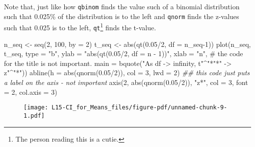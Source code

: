 \documentclass[
  letterpaper,
  DIV=11,
  numbers=noendperiod]{scrreprt}
\newenvironment{Shaded}{\begin{snugshade}}{\end{snugshade}}
\newcommand{\AttributeTok}[1]{\textcolor[rgb]{0.40,0.45,0.13}{#1}}
\newcommand{\CommentTok}[1]{\textcolor[rgb]{0.37,0.37,0.37}{#1}}
\newcommand{\DecValTok}[1]{\textcolor[rgb]{0.68,0.00,0.00}{#1}}
\newcommand{\DocumentationTok}[1]{\textcolor[rgb]{0.37,0.37,0.37}{\textit{#1}}}
\newcommand{\FloatTok}[1]{\textcolor[rgb]{0.68,0.00,0.00}{#1}}
\newcommand{\FunctionTok}[1]{\textcolor[rgb]{0.28,0.35,0.67}{#1}}
\newcommand{\NormalTok}[1]{\textcolor[rgb]{0.00,0.23,0.31}{#1}}
\newcommand{\OtherTok}[1]{\textcolor[rgb]{0.00,0.23,0.31}{#1}}
\newcommand{\SpecialCharTok}[1]{\textcolor[rgb]{0.37,0.37,0.37}{#1}}
\newcommand{\StringTok}[1]{\textcolor[rgb]{0.13,0.47,0.30}{#1}}
\begin{document}
Note that, just like how \texttt{qbinom} finds the value such of a
binomial distribution such that 0.025\% of the distribution is to the
left and \texttt{qnorm} finds the z-values such that 0.025 is to the
left, \texttt{qt}\footnote{The person reading this is a cutie.} finds
the t-value.

\begin{Shaded}
\begin{Highlighting}[]
\NormalTok{n\_seq }\OtherTok{\textless{}{-}} \FunctionTok{seq}\NormalTok{(}\DecValTok{2}\NormalTok{, }\DecValTok{100}\NormalTok{, }\AttributeTok{by =} \DecValTok{2}\NormalTok{)}
\NormalTok{t\_seq }\OtherTok{\textless{}{-}} \FunctionTok{abs}\NormalTok{(}\FunctionTok{qt}\NormalTok{(}\FloatTok{0.05}\SpecialCharTok{/}\DecValTok{2}\NormalTok{, }\AttributeTok{df =}\NormalTok{ n\_seq}\DecValTok{{-}1}\NormalTok{))}
\FunctionTok{plot}\NormalTok{(n\_seq, t\_seq, }\AttributeTok{type =} \StringTok{"b"}\NormalTok{,}
    \AttributeTok{ylab =} \StringTok{"abs(qt(0.05/2, df = n {-} 1))"}\NormalTok{,}
    \AttributeTok{xlab =} \StringTok{"n"}\NormalTok{,}
    \CommentTok{\# the code for the title is not important.}
    \AttributeTok{main =} \FunctionTok{bquote}\NormalTok{(}\StringTok{"As df {-}\textgreater{} infinity, t"}\SpecialCharTok{\^{}}\StringTok{"*"}\SpecialCharTok{*}\StringTok{" {-}\textgreater{} z"}\SpecialCharTok{\^{}}\StringTok{"*"}\NormalTok{))}
\FunctionTok{abline}\NormalTok{(}\AttributeTok{h =} \FunctionTok{abs}\NormalTok{(}\FunctionTok{qnorm}\NormalTok{(}\FloatTok{0.05}\SpecialCharTok{/}\DecValTok{2}\NormalTok{)), }\AttributeTok{col =} \DecValTok{3}\NormalTok{, }\AttributeTok{lwd =} \DecValTok{2}\NormalTok{)}
\DocumentationTok{\#\# this code just puts a label on the axis {-} not important}
\FunctionTok{axis}\NormalTok{(}\DecValTok{2}\NormalTok{, }\FunctionTok{abs}\NormalTok{(}\FunctionTok{qnorm}\NormalTok{(}\FloatTok{0.05}\SpecialCharTok{/}\DecValTok{2}\NormalTok{)), }\StringTok{"z*"}\NormalTok{, }\AttributeTok{col =} \DecValTok{3}\NormalTok{, }\AttributeTok{font =} \DecValTok{2}\NormalTok{, }\AttributeTok{col.axis =} \DecValTok{3}\NormalTok{)}
\end{Highlighting}
\end{Shaded}

\begin{figure}[H]

{\centering \texttt{[image: L15-CI\_for\_Means\_files/figure-pdf/unnamed-chunk-9-1.pdf]}

}

\end{figure}
\end{document}
